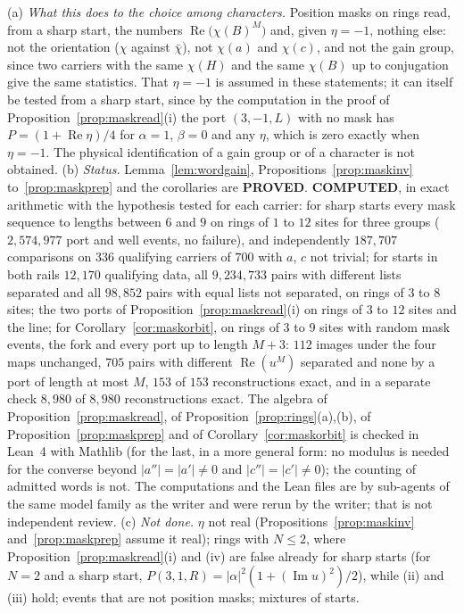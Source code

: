 \begin{remark}
(a) \emph{What this does to the choice among characters.} Position masks on rings read, from a sharp start, the numbers $\operatorname{Re}\bigl(\chi(B)^{M}\bigr)$ and, given $\eta=-1$, nothing else: not the orientation ($\chi$ against $\bar\chi$), not $\chi(a)$ and $\chi(c)$, and not the gain group, since two carriers with the same $\chi(H)$ and the same $\chi(B)$ up to conjugation give the same statistics. That $\eta=-1$ is assumed in these statements; it can itself be tested from a sharp start, since by the computation in the proof of Proposition~\ref{prop:maskread}(i) the port $(3,-1,L)$ with no mask has $P=(1+\operatorname{Re}\eta)/4$ for $\alpha=1$, $\beta=0$ and any $\eta$, which is zero exactly when $\eta=-1$. The physical identification of a gain group or of a character is not obtained.
(b) \emph{Status.} Lemma~\ref{lem:wordgain}, Propositions~\ref{prop:maskinv} to~\ref{prop:maskprep} and the corollaries are \textbf{PROVED}. \textbf{COMPUTED}, in exact arithmetic with the hypothesis tested for each carrier: for sharp starts every mask sequence to lengths between $6$ and $9$ on rings of $1$ to $12$ sites for three groups ($2{,}574{,}977$ port and well events, no failure), and independently $187{,}707$ comparisons on $336$ qualifying carriers of $700$ with $a$, $c$ not trivial; for starts in both rails $12{,}170$ qualifying data, all $9{,}234{,}733$ pairs with different lists separated and all $98{,}852$ pairs with equal lists not separated, on rings of $3$ to $8$ sites; the two ports of Proposition~\ref{prop:maskread}(i) on rings of $3$ to $12$ sites and the line; for Corollary~\ref{cor:maskorbit}, on rings of $3$ to $9$ sites with random mask events, the fork and every port up to length $M+3$: $112$ images under the four maps unchanged, $705$ pairs with different $\operatorname{Re}(u^{M})$ separated and none by a port of length at most $M$, $153$ of $153$ reconstructions exact, and in a separate check $8{,}980$ of $8{,}980$ reconstructions exact. The algebra of Proposition~\ref{prop:maskread}, of Proposition~\ref{prop:rings}(a),(b), of Proposition~\ref{prop:maskprep} and of Corollary~\ref{cor:maskorbit} is checked in Lean~4 with Mathlib (for the last, in a more general form: no modulus is needed for the converse beyond $|a''|=|a'|\ne0$ and $|c''|=|c'|\ne0$); the counting of admitted words is not. The computations and the Lean files are by sub-agents of the same model family as the writer and were rerun by the writer; that is not independent review.
(c) \emph{Not done.} $\eta$ not real (Propositions~\ref{prop:maskinv} and~\ref{prop:maskprep} assume it real); rings with $N\le2$, where Proposition~\ref{prop:maskread}(i) and (iv) are false already for sharp starts (for $N=2$ and a sharp start, $P(3,1,R)=|\alpha|^{2}(1+(\operatorname{Im}u)^{2})/2$), while (ii) and (iii) hold; events that are not position masks; mixtures of starts.
\end{remark}

